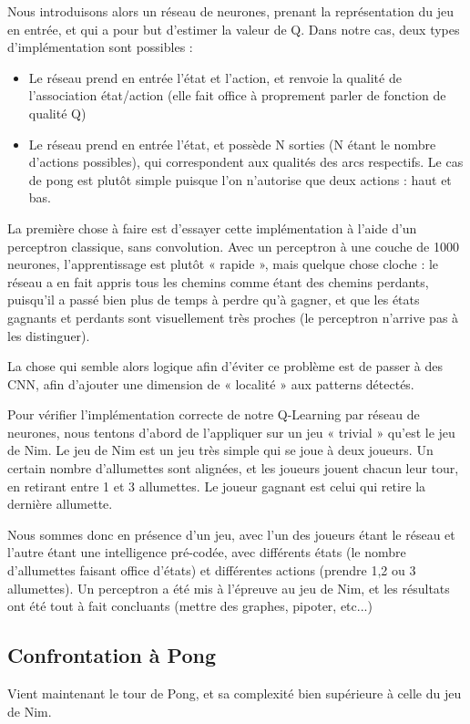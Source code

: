 \documentclass[
    10pt,
    a4paper,
    oneside,
    headinclude,footinclude,
    BCOR=5mm,
    captions=tableabove
]{scrartcl}
\begin{document}
Nous introduisons alors un réseau de neurones, prenant la représentation du jeu en entrée, et qui a pour but d’estimer la valeur de Q. Dans notre cas, deux types d’implémentation sont possibles :
\begin{itemize}
	\item Le réseau prend en entrée l’état et l’action, et renvoie la qualité de l’association état/action (elle fait office à proprement parler de fonction de qualité Q)
	\item Le réseau prend en entrée l’état, et possède N sorties (N étant le nombre d’actions possibles), qui correspondent aux qualités des arcs respectifs. Le cas de pong est plutôt simple puisque l’on n’autorise que deux actions : haut et bas.
\end{itemize}

La première chose à faire est d’essayer cette implémentation à l’aide d’un perceptron classique, sans convolution. Avec un perceptron à une couche de 1000 neurones, l’apprentissage est plutôt « rapide », mais quelque chose cloche : le réseau a en fait appris tous les chemins comme étant des chemins perdants, puisqu’il a passé bien plus de temps à perdre qu’à gagner, et que les états gagnants et perdants sont visuellement très proches (le perceptron n’arrive pas à les distinguer).

La chose qui semble alors logique afin d’éviter ce problème est de passer à des CNN, afin d’ajouter une dimension de « localité » aux patterns détectés.

Pour vérifier l’implémentation correcte de notre Q-Learning par réseau de neurones, nous tentons d’abord de l’appliquer sur un jeu « trivial » qu’est le jeu de Nim. Le jeu de Nim est un jeu très simple qui se joue à deux joueurs. Un certain nombre d’allumettes sont alignées, et les joueurs jouent chacun leur tour, en retirant entre 1 et 3 allumettes. Le joueur gagnant est celui qui retire la dernière allumette.

Nous sommes donc en présence d’un jeu, avec l’un des joueurs étant le réseau et l’autre étant une intelligence pré-codée, avec différents états (le nombre d’allumettes faisant office d’états) et différentes actions (prendre 1,2 ou 3 allumettes). Un perceptron a été mis à l’épreuve au jeu de Nim, et les résultats ont été tout à fait concluants (mettre des graphes, pipoter, etc...)

\subsection{Confrontation à Pong}
Vient maintenant le tour de Pong, et sa complexité bien supérieure à celle du jeu de Nim.
\end{document}
